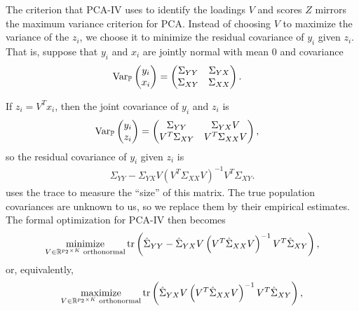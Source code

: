 \documentclass{article}
\begin{document}
The criterion that PCA-IV uses to identify the loadings $V$ and scores $Z$
mirrors the maximum variance criterion for PCA. Instead of choosing $V$ to
maximize the variance of the $z_{i}$, we choose it to minimize the residual
covariance of $y_{i}$ given $z_{i}$. That is, suppose that $y_{i}$ and $x_{i}$
are jointly normal with mean 0 and covariance
\begin{align*}
\mathrm{Var}_{\mathbb{P}}\begin{pmatrix}y_{i} \\ x_{i}\end{pmatrix} &=
\begin{pmatrix}
  \Sigma_{YY} & \Sigma_{YX} \\
  \Sigma_{XY} & \Sigma_{XX}
\end{pmatrix}.
\end{align*}

If $z_{i} = V^{T}x_{i}$, then the joint covariance of $y_{i}$ and $z_{i}$ is
\begin{align*}
  \mathrm{Var}_{\mathbb{P}}\begin{pmatrix} y_{i} \\ z_{i} \end{pmatrix} &=
  \begin{pmatrix}
    \Sigma_{YY} & \Sigma_{YX}V \\
    V^{T}\Sigma_{XY} & V^{T}\Sigma_{XX}V
  \end{pmatrix},
\end{align*}
so the residual covariance of $y_i$ given $z_{i}$ is
\begin{align}
  \Sigma_{YY} -
  \Sigma_{YX}V\left(V^{T}\Sigma_{XX}V\right)^{-1}V^{T}\Sigma_{XY}. \label{eq:pca_iv_resid_cov}
\end{align}
\citep{rao1964use} uses the trace to measure the ``size'' of this matrix. The
true population covariances are unknown to us, so we replace them by their
empirical estimates. The formal optimization for PCA-IV then becomes
\begin{align}
  \mathop\mathrm{minimize}_{V\in \mathbb{R}^{p_{2} \times K} \text{ orthonormal}}
  \mathop\mathrm{tr}\left(\hat{\Sigma}_{YY} -
  \hat{\Sigma}_{YX}V\left(V^{T}\hat{\Sigma}_{XX}V\right)^{-1}V^{T}\hat{\Sigma}_{XY}\right) \label{eq:pca_iv_obj},
\end{align}
or, equivalently,
\begin{align}
  \mathop\mathrm{maximize}_{V\in \mathbb{R}^{p_{2} \times K} \text{ orthonormal}}
  \mathop\mathrm{tr}\left(\hat{\Sigma}_{YX}V\left(V^{T}\hat{\Sigma}_{XX}V\right)^{-1}V^{T}\hat{\Sigma}_{XY}\right) \label{eq:pca_iv_obj_2},
\end{align}
\end{document}
